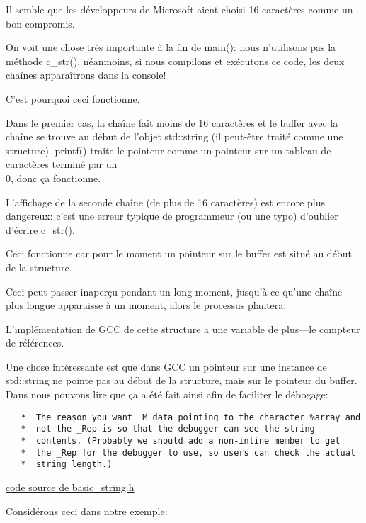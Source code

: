 Il semble que les développeurs de Microsoft aient choisi 16 caractères comme un bon
compromis.

On voit une chose très importante à la fin de main(): nous n'utilisons pas la méthode
c\_str(), néanmoins, si nous compilons et exécutons ce code, les deux chaînes apparaîtrons
dans la console!

C'est pourquoi ceci fonctionne.

Dans le premier cas, la chaîne fait moins de 16 caractères et le buffer avec la chaîne
se trouve au début de l'objet std::string (il peut-être traité comme une structure).
printf() traite le pointeur comme un pointeur sur un tableau de caractères terminé
par un \\0, donc ça fonctionne.

L'affichage de la seconde chaîne (de plus de 16 caractères) est encore plus dangereux:
c'est une erreur typique de programmeur (ou une typo) d'oublier d'écrire c\_str().

Ceci fonctionne car pour le moment un pointeur sur le buffer est situé au début de
la structure.

Ceci peut passer inaperçu pendant un long moment, jusqu'à ce qu'une chaîne plus longue
apparaisse à un moment, alors le processus plantera.


L'implémentation de GCC de cette structure a une variable de plus---le compteur de
références.

Une chose intéressante est que dans GCC un pointeur sur une instance de std::string
ne pointe pas au début de la structure, mais sur le pointeur du buffer.
Dans 
nous pouvons lire que ça a été fait ainsi afin de faciliter le débogage:

\begin{lstlisting}
   *  The reason you want _M_data pointing to the character %array and
   *  not the _Rep is so that the debugger can see the string
   *  contents. (Probably we should add a non-inline member to get
   *  the _Rep for the debugger to use, so users can check the actual
   *  string length.)
\end{lstlisting}

\href{http://go.yurichev.com/17085}{code source de basic\_string.h}

Considérons ceci dans notre exemple:



